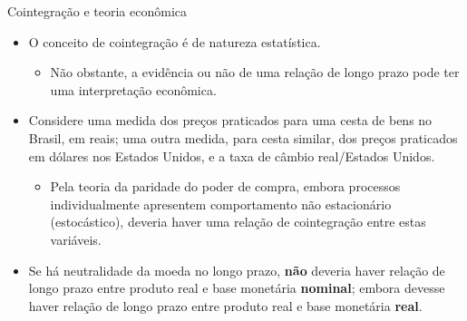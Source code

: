 \documentclass[11pt]{beamer}
\begin{document}
\begin{frame}{Cointegração e teoria econômica}
	\begin{itemize}
		\item O conceito de cointegração é de natureza estatística.
		\begin{itemize}
			\item Não obstante, a evidência ou não de uma relação de longo prazo pode ter uma interpretação econômica.
		\end{itemize}
		\item Considere uma medida dos preços praticados para uma cesta de bens no Brasil, em reais; uma outra medida, para cesta similar, dos preços praticados em dólares nos Estados Unidos, e a taxa de câmbio real/Estados Unidos.
		\begin{itemize}
		\item  {\color{blue}Pela teoria da paridade do poder de compra}, embora processos individualmente apresentem comportamento não estacionário (estocástico), deveria haver uma relação de cointegração entre estas variáveis.
		\end{itemize}
		
		\item {\color{blue}Se há neutralidade da moeda no longo prazo}, \textbf{não} deveria haver relação de longo prazo entre produto real e base monetária \textbf{nominal}; embora devesse haver relação de longo prazo entre produto real e base monetária \textbf{real}.
		
	\end{itemize}
\end{frame}
\end{document}
